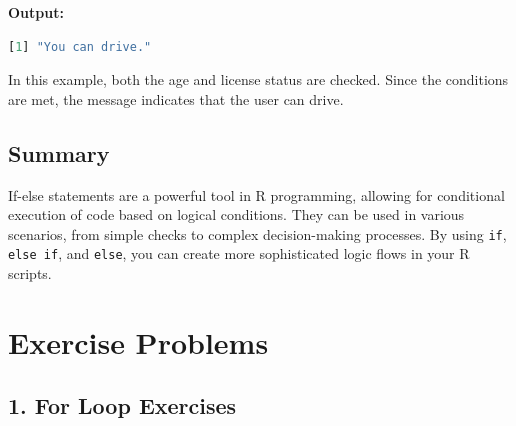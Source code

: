 \documentclass[10pt]{book}
\begin{document}
\textbf{Output:}
\begin{lstlisting}[language=R]
[1] "You can drive."
\end{lstlisting}

In this example, both the age and license status are checked. Since the conditions are met, the message indicates that the user can drive.

\subsection{Summary}

If-else statements are a powerful tool in R programming, allowing for conditional execution of code based on logical conditions. They can be used in various scenarios, from simple checks to complex decision-making processes. By using \texttt{if}, \texttt{else if}, and \texttt{else}, you can create more sophisticated logic flows in your R scripts.



\section*{Exercise Problems}

\subsection*{1. For Loop Exercises}
\end{document}
